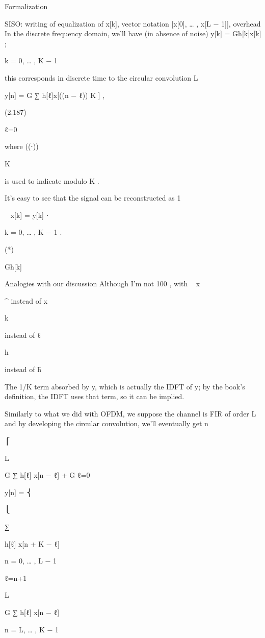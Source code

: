 {Formalization

SISO: writing of equalization of x[k], vector notation [x[0], … , x[L − 1]], overhead In the discrete frequency domain, we'll have (in absence of noise)
y[k] = \sqrt Gh[k]x[k] ;

k = 0, … , K − 1

this corresponds in discrete time to the circular convolution L

y[n] = \sqrt G ∑ h[ℓ]x[((n − ℓ)) K ] ,

(2.187)

ℓ=0

where ((⋅))

K

is used to indicate modulo K .

It's easy to see that the signal can be reconstructed as 1

~
x[k] = y[k] ⋅

k = 0, … , K − 1 .

(*)

\sqrt Gh[k]

​Analogies with our discussion Although I'm not 100%
, with
~
x

^
instead of x

k

instead of ℓ

h

instead of h̄

The 1/K term absorbed by y, which is actually the IDFT of y; by the book's definition, the IDFT uses that term, so it can be implied.

Similarly to what we did with OFDM, we suppose the channel is FIR of order L and by developing the circular convolution, we'll eventually get n

⎧

L

\sqrt G ∑ h[ℓ] x[n − ℓ] + \sqrt G ℓ=0

y[n] = ⎨

⎩

∑

h[ℓ] x[n + K − ℓ]

n = 0, … , L − 1

ℓ=n+1

L

\sqrt G ∑ h[ℓ] x[n − ℓ]

n = L, … , K − 1

}
